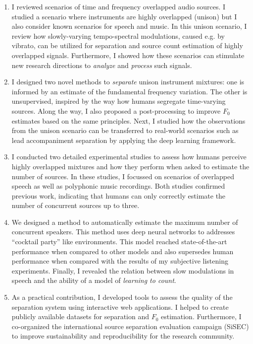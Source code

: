 \begin{enumerate}
\item I reviewed scenarios of time and frequency overlapped audio sources.
I studied a scenario where instruments are highly overlapped (unison) but I also consider known scenarios for speech and music.
In this unison scenario, I review how slowly-varying tempo-spectral modulations, caused e.g. by vibrato, can be utilized for separation and source count estimation of highly overlapped signals.
Furthermore, I showed how these scenarios can stimulate new research directions to \emph{analyze} and \emph{process} such signals.

\item I designed two novel methods to \emph{separate} unison instrument mixtures: one is informed by an estimate of the fundamental frequency variation.
The other is unsupervised, inspired by the way how humans segregate time-varying sources.
Along the way, I also proposed a post-processing to improve \(F_0\) estimates based on the same principles.
Next, I studied how the observations from the unison scenario can be transferred to real-world scenarios such as lead accompaniment separation by applying the deep learning framework.

\item I conducted two detailed experimental studies to assess how humans perceive highly overlapped mixtures and how they perform when asked to estimate the number of sources.
In these studies, I focussed on scenarios of overlapped speech as well as polyphonic music recordings.
Both studies confirmed previous work, indicating that humans can only correctly estimate the number of concurrent sources up to three.

\item We designed a method to automatically estimate the maximum number of concurrent speakers. This method uses deep neural networks to addresses ``cocktail party'' like environments.
This model reached state-of-the-art performance when compared to other models and also supersedes human performance when compared with the results of my subjective listening experiments.
Finally, I revealed the relation between slow modulations in speech and the ability of a model of \emph{learning to count}.

\item As a practical contribution, I developed tools to assess the quality of the separation system using interactive web applications. 
I helped to create publicly available datasets for separation and \(F_0\) estimation.
Furthermore, I co-organized the international source separation evaluation campaign (SiSEC) to improve sustainability and reproducibility for the research community.
\end{enumerate}

